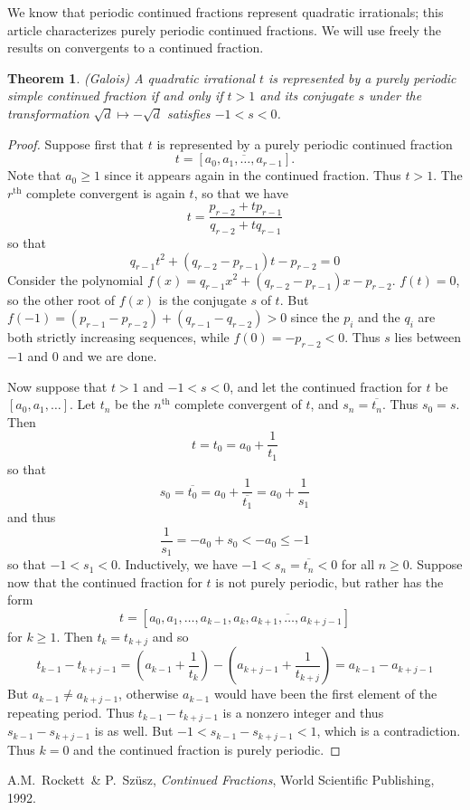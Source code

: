 \documentclass[12pt]{article}
\newtheorem{thm}{Theorem}
\theoremstyle{definition}
\begin{document}
We know that periodic continued fractions represent quadratic irrationals; this article characterizes purely periodic continued fractions. We will use freely the results on convergents to a continued fraction.

\begin{thm} (Galois) A quadratic irrational $t$ is represented by a purely periodic simple continued fraction if and only if $t>1$ and its conjugate $s$ under the transformation $\sqrt{d}\mapsto -\sqrt{d}$ satisfies $-1<s<0$.
\end{thm}

\begin{proof} Suppose first that $t$ is represented by a purely periodic continued fraction
\[t=[\overline{a_0,a_1,\ldots,a_{r-1}}].\]
Note that $a_0\geq 1$ since it appears again in the continued fraction. Thus $t>1$. The $r^{\mathrm{th}}$ complete convergent is again $t$, so that we have
\[t = \frac{p_{r-2}+tp_{r-1}}{q_{r-2}+tq_{r-1}}\]
so that 
\[q_{r-1}t^2 + (q_{r-2}-p_{r-1})t - p_{r-2}=0\]
Consider the polynomial $f(x) = q_{r-1}x^2 + (q_{r-2}-p_{r-1})x - p_{r-2}$. $f(t)=0$, so the other root of $f(x)$ is the conjugate $s$ of $t$. But $f(-1) = (p_{r-1}-p_{r-2})+(q_{r-1}-q_{r-2})>0$ since the $p_i$ and the $q_i$ are both strictly increasing sequences, while $f(0) = -p_{r-2}<0$. Thus $s$ lies between $-1$ and $0$ and we are done.

Now suppose that $t>1$ and $-1<s<0$, and let the continued fraction for $t$ be $[a_0,a_1,\ldots]$. Let $t_n$ be the $n^{\mathrm{th}}$ complete convergent of $t$, and $s_n = \overline{t_n}$. Thus $s_0=s$. Then
\[t=t_0 = a_0 + \frac{1}{t_1}\]
so that
\[s_0 = \overline{t_0} = a_0+\frac{1}{\overline{t_1}} = a_0+\frac{1}{s_1}\]
and thus
\[\frac{1}{s_1} = -a_0 + s_0 < -a_0 \leq -1\]
so that $-1 < s_1 < 0$. Inductively, we have $-1 < s_n = \overline{t_n} < 0$ for all $n\geq 0$. Suppose now that the continued fraction for $t$ is not purely periodic, but rather has the form
\[t = [a_0,a_1,\ldots,a_{k-1},\overline{a_k,a_{k+1},\ldots,a_{k+j-1}}]\]
for $k\geq 1$. Then $t_k = t_{k+j}$ and so
\[t_{k-1}-t_{k+j-1} = \left(a_{k-1}+\frac{1}{t_k}\right) - \left(a_{k+j-1}+\frac{1}{t_{k+j}}\right) = a_{k-1}-a_{k+j-1}\]
But $a_{k-1}\neq a_{k+j-1}$, otherwise $a_{k-1}$ would have been the first element of the repeating period. Thus $t_{k-1}-t_{k+j-1}$ is a nonzero integer and thus $s_{k-1}-s_{k+j-1}$ is as well. But $-1<s_{k-1}-s_{k+j-1}<1$, which is a contradiction. Thus $k=0$ and the continued fraction is purely periodic.
\end{proof}

\begin{thebibliography}{10}
A.M.~Rockett~\& P.~Sz\"usz, \emph{Continued Fractions}, World Scientific Publishing, 1992.
\end{thebibliography}




\end{document}

